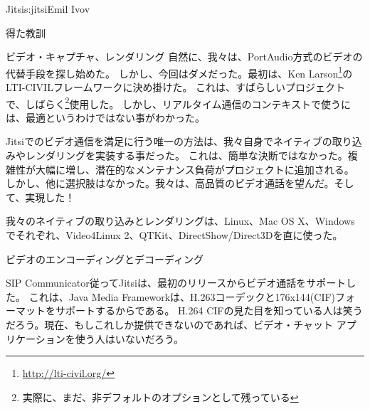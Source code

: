 \begin{aosachapter}{Jitsi}{s:jitsi}{Emil Ivov}
\begin{aosasect1}{得た教訓}
\begin{aosasect2}{ビデオ・キャプチャ、レンダリング}
自然に、我々は、PortAudio方式のビデオの代替手段を探し始めた。
しかし、今回はダメだった。最初は、Ken Larson\footnote{\url{http://lti-civil.org/}}のLTI-CIVILフレームワークに決め掛けた。
これは、すばらしいプロジェクトで、しばらく\footnote{実際に、まだ、非デフォルトのオプションとして残っている}使用した。
しかし、リアルタイム通信のコンテキストで使うには、最適というわけではない事がわかった。

Jitsiでのビデオ通信を満足に行う唯一の方法は、我々自身でネイティブの取り込みやレンダリングを実装する事だった。
これは、簡単な決断ではなかった。複雑性が大幅に増し、潜在的なメンテナンス負荷がプロジェクトに追加される。
しかし、他に選択肢はなかった。我々は、高品質のビデオ通話を望んだ。そして、実現した！

我々のネイティブの取り込みとレンダリングは、Linux、Mac OS X、Windowsでそれぞれ、Video4Linux 2、QTKit、DirectShow/Direct3Dを直に使った。

\end{aosasect2}

\begin{aosasect2}{ビデオのエンコーディングとデコーディング}

SIP Communicator従ってJitsiは、最初のリリースからビデオ通話をサポートした。
これは、Java Media Frameworkは、H.263コーデックと176x144(CIF)フォーマットをサポートするからである。
H.264 CIFの見た目を知っている人は笑うだろう。現在、もしこれしか提供できないのであれば、ビデオ・チャット アプリケーションを使う人はいないだろう。


\end{aosasect2}
\end{aosasect1}
\end{aosachapter}
